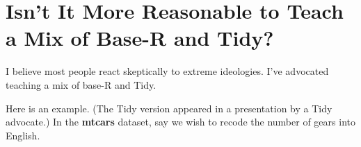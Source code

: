 \documentclass[11pt]{article}
\begin{document}
\begin{parcolumns}[rulebetween=true]{2}


\hspace{0.1in}


\end{parcolumns}

\section*{Isn't It More Reasonable to Teach a Mix of Base-R and Tidy?}

I believe most people react skeptically to extreme ideologies.  I've
advocated teaching a mix of base-R and Tidy.

Here is an example.  (The Tidy version appeared in a presentation by a
Tidy advocate.)  In the \textbf{mtcars} dataset, say we wish to recode
the number of gears into English.
\end{document}
